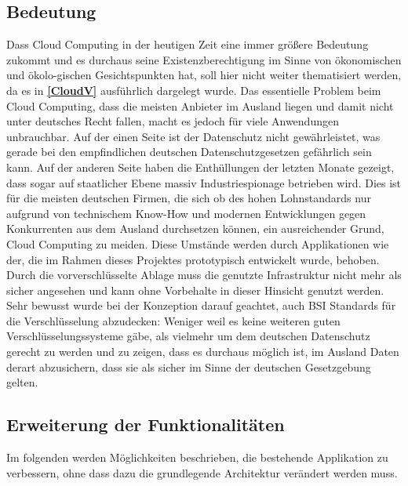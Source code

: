 \documentclass[13pt,a4paper,bibliography=totocnumbered,listof=totocnumbered]{scrartcl}
\begin{document}
\subsection{Bedeutung}
Dass Cloud Computing in der heutigen Zeit eine immer größere Bedeutung zukommt und es durchaus seine Existenzberechtigung im Sinne von ökonomischen und ökolo-gischen Gesichtspunkten hat, soll hier nicht weiter thematisiert werden, da es in \textbf{\ref{CloudV} } ausführlich dargelegt wurde. Das essentielle Problem beim Cloud Computing, dass die meisten Anbieter im Ausland liegen und damit nicht unter deutsches Recht fallen, macht es jedoch für viele Anwendungen unbrauchbar. Auf der einen Seite ist der Datenschutz nicht gewährleistet, was gerade bei den empfindlichen deutschen Datenschutzgesetzen gefährlich sein kann. Auf der anderen Seite haben die Enthüllungen der letzten Monate gezeigt, dass sogar auf staatlicher Ebene massiv Industriespionage betrieben wird. Dies ist für die meisten deutschen Firmen, die sich ob des hohen Lohnstandards nur aufgrund von technischem Know-How und modernen Entwicklungen gegen Konkurrenten aus dem Ausland durchsetzen können, ein ausreichender Grund, Cloud Computing zu meiden. Diese Umstände werden durch Applikationen wie der, die im Rahmen dieses Projektes prototypisch entwickelt wurde, behoben. Durch die vorverschlüsselte Ablage muss die genutzte Infrastruktur nicht mehr als sicher angesehen und kann ohne Vorbehalte in dieser Hinsicht genutzt werden. Sehr bewusst wurde bei der Konzeption darauf geachtet, auch BSI Standards für die Verschlüsselung abzudecken: Weniger weil es keine weiteren guten Verschlüsselungssysteme gäbe, als vielmehr um dem deutschen Datenschutz gerecht zu werden und zu zeigen, dass es durchaus möglich ist, im Ausland Daten derart abzusichern, dass sie als sicher im Sinne der deutschen Gesetzgebung gelten.
\pagebreak
\subsection{Erweiterung der Funktionalitäten}
Im folgenden werden Möglichkeiten beschrieben, die bestehende Applikation zu verbessern, ohne dass dazu die grundlegende Architektur verändert werden muss.
\end{document}
